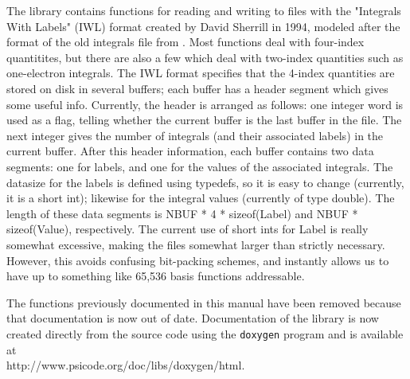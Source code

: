 The library  contains functions for reading and
writing to files with the "Integrals With Labels" (IWL) format created
by David Sherrill in 1994, modeled after the format of the old
integrals file from \PSItwo.  Most functions deal with four-index
quantitites, but there are also a few which deal with two-index
quantities such as one-electron integrals.  The IWL format specifies
that the 4-index quantities are stored on disk in several buffers;
each buffer has a header segment which gives some useful info.
Currently, the header is arranged as follows: one integer word is used
as a flag, telling whether the current buffer is the last buffer in
the file.  The next integer gives the number of integrals (and their
associated labels) in the current buffer.  After this header
information, each buffer contains two data segments: one for labels,
and one for the values of the associated integrals.  The datasize for
the labels is defined using typedefs, so it is easy to change
(currently, it is a short int); likewise for the integral values
(currently of type double).  The length of these data segments is NBUF
* 4 * sizeof(Label) and NBUF * sizeof(Value), respectively.  The
current use of short ints for Label is really somewhat excessive,
making the files somewhat larger than strictly necessary.  However,
this avoids confusing bit-packing schemes, and instantly allows us to
have up to something like 65,536 basis functions addressable.

The functions previously documented in this manual have been removed
because that documentation is now out of date.  Documentation of the
library is now created directly from the source code using the 
{\tt doxygen} program and is available at \\
{http://www.psicode.org/doc/libs/doxygen/html}.

